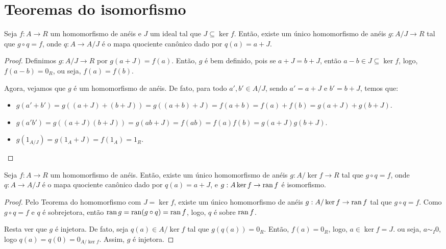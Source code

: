 \section{Teoremas do isomorfismo}
\begin{theorem}
    Seja $f:A\rightarrow R$ um homomorfismo de anéis e $J$ um ideal tal que $J\subseteq \ker f$. Então, existe um único homomorfismo de anéis $g:A/J\rightarrow R$ tal que $g\circ q=f$, onde $q:A\rightarrow A/J$ é o mapa quociente canônico dado por $q(a)=a+J$.
\end{theorem}
\begin{proof}
    Definimos $g:A/J\rightarrow R$ por $g(a+J)=f(a)$. Então, $g$ é bem definido, pois se $a+J=b+J$, então $a-b \in J\subseteq \ker f$, logo, $f(a-b)=0_R$, ou seja, $f(a)=f(b)$.

    Agora, vejamos que $g$ é um homomorfismo de anéis. De fato, para todo $a', b' \in A/J$, sendo $a'=a+J$ e $b'=b+J$, temos que:
    \begin{itemize}
        \item $g(a'+b')=g((a+J)+(b+J))=g((a+b)+J)=f(a+b)=f(a)+f(b)=g(a+J)+g(b+J)$.
        \item $g(a'b')=g((a+J)(b+J))=g(ab+J)=f(ab)=f(a)f(b)=g(a+J)g(b+J)$.
        \item $g(1_{A/J})=g(1_A+J)=f(1_A)=1_R$.
    \end{itemize}
\end{proof}

\begin{theorem}
    Seja $f:A\rightarrow R$ um homomorfismo de anéis. Então, existe um único homomorfismo de anéis $g:A/\ker f\rightarrow R$ tal que $g\circ q=f$, onde $q:A\rightarrow A/J$ é o mapa quociente canônico dado por $q(a)=a+J$, e $g:A\ker f\rightarrow \operatorname{ran} f$ é isomorfismo.
\end{theorem}
\begin{proof}
    Pelo Teorema do homomorfismo com $J=\ker f$, existe um único homomorfismo de anéis $g:A/\ker f\rightarrow \operatorname{ran} f$ tal que $g\circ q=f$. Como $g\circ q=f$ e $q$ é sobrejetora, então $\operatorname{ran} g=\operatorname{ran} (g\circ q)=\operatorname{ran} f$, logo, $q$ é sobre $\operatorname{ran} f$.
    
    Resta ver que $g$ é injetora. De fato, seja $q(a)\in A/\ker f$ tal que $g(q(a))=0_R$. Então, $f(a)=0_R$, logo, $a\in \ker f=J$. ou seja, $a\sim_I 0$, logo $q(a)=q(0)=0_{A/\ker f}$. Assim, $g$ é injetora.
\end{proof}
